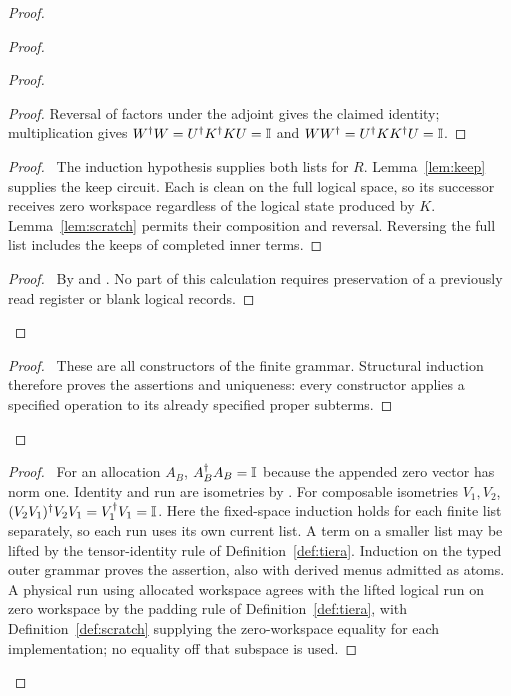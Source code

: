\begin{proof}
\begin{proof}
\begin{proof}
\begin{proof}
   Reversal of factors under the adjoint gives the claimed identity;
   multiplication gives $W^\dagger W=U^\dagger K^\dagger KU=\mathbb{I}$
   and $WW^\dagger=U^\dagger KK^\dagger U=\mathbb{I}$.
   \end{proof}
   \begin{proof}\pf\ The induction hypothesis supplies both lists
   for $R$. Lemma~\ref{lem:keep} supplies the keep circuit. Each is
   clean on the full logical space, so its successor receives zero
   workspace regardless of the logical state produced by $K$.
   Lemma~\ref{lem:scratch} permits their composition and reversal.
   Reversing the full list includes the keeps of completed inner terms.
   \end{proof}
   \qedstep
   \begin{proof}\pf\ By  and
   . No part of this calculation requires
   preservation of a previously read register or blank logical records.
   \end{proof}
  \end{proof}
  \qedstep
  \begin{proof}\pf\ These are all constructors of the finite grammar.
  Structural induction therefore proves the assertions and uniqueness:
  every constructor applies a specified operation to its already specified
  proper subterms.
  \end{proof}
 \end{proof}
 \begin{proof}\pf\ For an allocation $A_B$, $A_B^\dagger A_B=\mathbb{I}$
 because the appended zero vector has norm one. Identity and run are
 isometries by . For composable isometries
 $V_1,V_2$, $(V_2V_1)^\dagger V_2V_1=V_1^\dagger V_1=\mathbb{I}$.
 Here the fixed-space induction holds for each finite list separately,
 so each run uses its own current list. A term on a smaller list may
 be lifted by the tensor-identity rule of Definition~\ref{def:tiera}.
 Induction on the typed outer grammar proves the assertion, also with
 derived menus admitted as atoms. A physical run using allocated
 workspace agrees with the lifted logical run on zero workspace by the padding rule of Definition~\ref{def:tiera}, with Definition~\ref{def:scratch} supplying the zero-workspace equality for each implementation; no equality off that subspace is used.
 \end{proof}

\end{proof}
